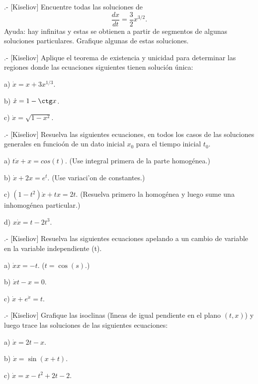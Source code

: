 %
%

%
%
%

.- [Kiseliov]
Encuentre todas las soluciones de 
\begin{equation}
  \label{eq:tresmedios}
  \frac{dx}{dt} = \frac{3}{2} x^{3/2}.
\end{equation}
%
Ayuda: hay infinitas y estas se obtienen a partir de segmentos de algunas
soluciones particulares.
Grafique algunas de estas soluciones.
\ePro

.- [Kiseliov]
Aplique el teorema de existencia y unicidad para determinar las regiones
donde las ecuaciones siguientes tienen soluci\'on \'unica:

a) $\dot{x} = x + 3 x^{1/3}$.

b) $\dot{x} = 1 -\ctg x$.

c) $\dot{x} = \sqrt{1-x^2}$.
\ePro

.- [Kiseliov]
Resuelva las siguientes ecuaciones, en todos los casos de las
soluciones generales en funcio\'on de un dato inicial $x_0$
para el tiempo inicial $t_0$.

a) $t \dot{x} + x = cos(t)$. (Use integral primera de la parte homog\'enea.)

b) $\dot{x} + 2x = e^t$. (Use variaci'on de constantes.)

c) $(1-t^2)\dot{x} + tx = 2t$. (Resuelva primero la homog\'enea y luego
sume una inhomog\'enea particular.)

d) $x \dot{x} = t - 2t^3$.
\ePro

.- [Kiseliov]
Resuelva las siguientes ecuaciones apelando a un cambio de variable en
la variable independiente (t).

a) $\dot{x}x = -t$. ($t = \cos(s)$.)

b) $\dot{x}t - x =0$.

c) $\dot{x} + e^{\dot{x}} = t$.
\ePro

.- [Kiseliov]
Grafique las isoclinas (l\'\i{}neas de igual pendiente en el plano $(t,x)$)
y luego trace las soluciones de las siguientes ecuaciones:

a) $\dot{x} = 2t - x$.

b) $\dot{x} = \sin(x+t)$.

c) $\dot{x} = x -t^2 + 2t -2$.

